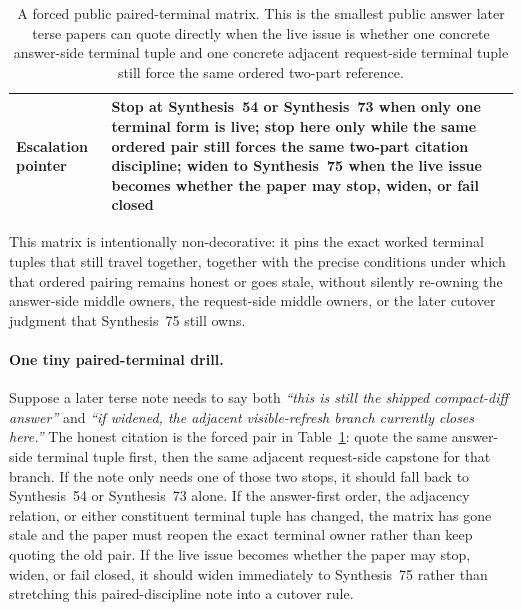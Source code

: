 \documentclass[11pt]{article}
\begin{document}
\begin{table}[t]
\begin{tabularx}{\linewidth}{@{}lX@{}}
Escalation pointer & Stop at Synthesis~54 or Synthesis~73 when only one terminal form is live; stop here only while the same ordered pair still forces the same two-part citation discipline; widen to Synthesis~75 when the live issue becomes whether the paper may stop, widen, or fail closed \\
\bottomrule
\end{tabularx}
\caption{A forced public paired-terminal matrix. This is the smallest public answer later terse papers can quote directly when the live issue is whether one concrete answer-side terminal tuple and one concrete adjacent request-side terminal tuple still force the same ordered two-part reference.}
\label{tab:forced-public-paired-terminal-matrix}
\end{table}

This matrix is intentionally non-decorative: it pins the exact worked terminal tuples that still travel together, together with the precise conditions under which that ordered pairing remains honest or goes stale, without silently re-owning the answer-side middle owners, the request-side middle owners, or the later cutover judgment that Synthesis~75 still owns.\cite{series:workedexample}

\paragraph{One tiny paired-terminal drill.}
Suppose a later terse note needs to say both \emph{``this is still the shipped compact-diff answer''} and \emph{``if widened, the adjacent visible-refresh branch currently closes here.''} The honest citation is the forced pair in Table~\ref{tab:forced-public-paired-terminal-matrix}: quote the same answer-side terminal tuple first, then the same adjacent request-side capstone for that branch. If the note only needs one of those two stops, it should fall back to Synthesis~54 or Synthesis~73 alone. If the answer-first order, the adjacency relation, or either constituent terminal tuple has changed, the matrix has gone stale and the paper must reopen the exact terminal owner rather than keep quoting the old pair. If the live issue becomes whether the paper may stop, widen, or fail closed, it should widen immediately to Synthesis~75 rather than stretching this paired-discipline note into a cutover rule.
\end{document}

